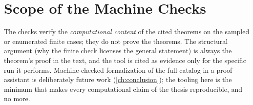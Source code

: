 \section{Scope of the Machine Checks}
The checks verify the \emph{computational content} of the cited theorems on the sampled or enumerated finite cases; they do not prove the theorems. The structural argument (why the finite check licenses the general statement) is always the theorem's proof in the text, and the tool is cited as evidence only for the specific run it performs. Machine-checked formalization of the full catalog in a proof assistant is deliberately future work (\autoref{ch:conclusion}); the tooling here is the minimum that makes every computational claim of the thesis reproducible, and no more.
